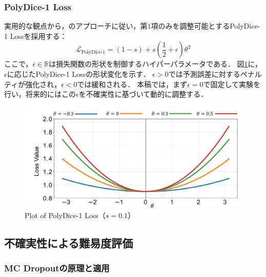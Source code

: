 \documentclass[10pt, a4paper, twocolumn]{jarticle}
\begin{document}

\subsubsection{PolyDice-1 Loss}
実用的な観点から，\cite{leng2022polyloss}のアプローチに従い，第$1$項のみを調整可能とするPolyDice-1 Lossを採用する：
\begin{equation}
  \mathcal{L}_{\text{PolyDice-1}} = (1 - s) + s \left(\frac{1}{2} + \epsilon\right) \theta^2
\end{equation}
ここで，$\epsilon \in \mathbb{R}$は損失関数の形状を制御するハイパーパラメータである．
図\ref{polydice}に，$\epsilon$に応じたPolyDice-1 Lossの形状変化を示す．
$\epsilon > 0$では予測誤差に対するペナルティが強化され，$\epsilon < 0$では緩和される．
本稿では，まず$\epsilon = 0$で固定して実験を行い，将来的にはこの$\epsilon$を不確実性に基づいて動的に調整する．

\begin{figure}
  \includegraphics[width=\columnwidth]{figure/loss.pdf}
  \caption{Plot of PolyDice-1 Loss（$s = 0.1$）}
  \label{polydice}
\end{figure}

\subsection{不確実性による難易度評価}

\subsubsection{MC Dropoutの原理と適用}
\end{document}
